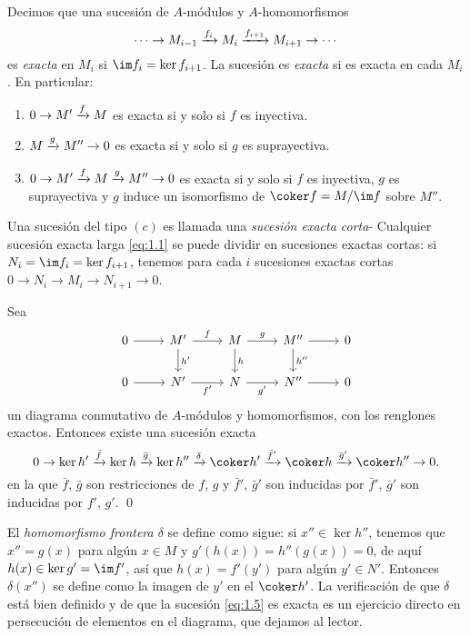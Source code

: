 Decimos que una sucesión de $A$-módulos y $A$-homomorfismos
\begin{equation}\label{eq:1.1}%
  \cdots \to M_{i-1}
    \labto{f_i} M_i 
    \labto{f_{i+1}} M_{i+1}
    \to \cdots  
\end{equation}
es \emph{exacta} en $M_i$ si $\im f_i = \ker f_{i+1}$. La sucesión es \emph{exacta} si es exacta en cada $M_i$. En particular:
\begin{enumerate}
  \item $0 \to M' \xrightarrow{f} M $ es exacta si y solo si $f$ es inyectiva.
  \item $M \xrightarrow{g} M'' \to 0$ es exacta si y solo si $g$ es suprayectiva.
  \item $0 \to M' \xrightarrow{f} M \xrightarrow{g} M'' \to 0$ es exacta si y solo si $f$ es inyectiva, $g$ es suprayectiva y $g$ induce un isomorfismo de $\coker f = M / \im f$ sobre $M''$.
\end{enumerate}

Una sucesión del tipo $(c)$ es llamada una \emph{sucesión exacta corta}- Cualquier sucesión exacta larga \eqref{eq:1.1} se puede dividir en sucesiones exactas cortas: si $N_i = \im f_i = \ker f_{i+1}$, tenemos para cada $i$ sucesiones exactas cortas $0 \to N_i \to M_i \to N_{i+1} \to 0$.

\begin{lemma}[de la serpiente]\label{prop:1.5.1}%
  Sea 
  \[
    \begin{tikzcd}
      0 \arrow[r] & M' \arrow[r, "f"] \arrow[d, "h'"] & M \arrow[r, "g"] \arrow[d, "h"] & M'' \arrow[r] \arrow[d, "h''"] & 0 \\
      0 \arrow[r] & N' \arrow[r, "f'"']               & N \arrow[r, "g'"']              & N'' \arrow[r]                  & 0
    \end{tikzcd}
  \]
  un diagrama conmutativo de $A$-módulos y homomorfismos, con los renglones exactos. Entonces existe una sucesión exacta
  \begin{equation}\label{eq:1.5}%
    0 \to \ker h' \labto{\bar f} \ker h \labto{\bar g} \ker h'' \labto{\delta} 
      \coker h' \labto{\bar f'} \coker h \labto{\bar g'} \coker h'' \to 0.
  \end{equation}
  en la que $\bar f$, $\bar g$ son restricciones de $f$, $g$ y $\bar f'$, $\bar g'$ son inducidas por $\bar f'$, $\bar g'$ son inducidas por $f'$, $g'$. \qed
\end{lemma}

El \emph{homomorfismo frontera $\delta$} se define como sigue: si $x'' \in \ker h''$, tenemos que $x'' = g(x)$ para algún $x \in M$ y $g'(h(x)) = h''(g(x)) = 0$, de aquí $h(x) \in \ker g' = \im f'$, así que $h(x) = f'(y')$ para algún $y' \in N'$. Entonces $\delta(x'')$ se define como la imagen de $y'$ en el $\coker h'$. La verificación de que $\delta$ está bien definido y de que la sucesión \eqref{eq:1.5} es exacta es un ejercicio directo en persecución de elementos en el diagrama, que dejamos al lector.



